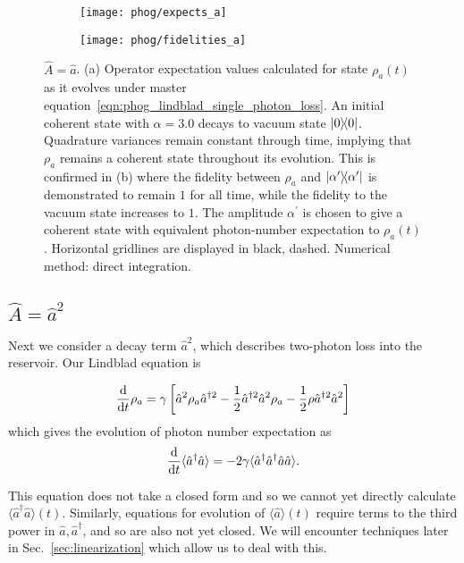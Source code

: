 \begin{figure}[htp]
\captionsetup{width=0.8\linewidth}
\centering
	\begin{subfigure}{0.7\linewidth}
	\centering
	\caption{}
	\texttt{[image: phog/expects\_a]}
	\end{subfigure}
	\begin{subfigure}{0.7\linewidth}
	\centering
	\caption{}
	\texttt{[image: phog/fidelities\_a]}
	\end{subfigure}
\caption{\label{fig:phog_lindblad_single_photon_loss}$\hat{A} = \hat{a}$. (a) Operator expectation values calculated for state $\rho_a\left(t\right)$ as it evolves under master equation~\ref{eqn:phog_lindblad_single_photon_loss}. An initial coherent state with $\alpha=3.0$ decays to vacuum state $\dyad{0}$. Quadrature variances remain constant through time, implying that $\rho_a$ remains a coherent state throughout its evolution. This is confirmed in (b) where the fidelity between $\rho_a$ and $\dyad{\alpha^\prime}$ is demonstrated to remain $1$ for all time, while the fidelity to the vacuum state increases to $1$. The amplitude $\alpha^\prime$ is chosen to give a coherent state with equivalent photon-number expectation to $\rho_a\left(t\right)$. Horizontal gridlines are displayed in black, dashed. Numerical method: direct integration.}
\end{figure}


\FloatBarrier
\subsection{$\hat{A} = \hat{a}^2$}\label{sec:A_aa}
Next we consider a decay term $\hat{a}^2$, which describes two-photon loss into the reservoir. Our Lindblad equation is

\begin{equation}\label{eqn:phog_lindblad_two_photon_loss}
\frac{\mathrm{d}}{\mathrm{d}t} \rho_a = \gamma\left[\hat{a}^2 \rho_a \hat{a}^{\dagger 2} - \frac{1}{2} \hat{a}^{\dagger 2} \hat{a}^2 \rho_a - \frac{1}{2} \rho \hat{a}^{\dagger 2} \hat{a}^2\right]
\end{equation}
which gives the evolution of photon number expectation as 
\begin{equation}\label{eqn:aa_not_closed}
\frac{\mathrm{d}}{\mathrm{d}t} \langle \hat{a}^\dagger \hat{a}\rangle = - 2 \gamma \langle \hat{a}^\dagger \hat{a}^\dagger \hat{a}\hat{a}\rangle.
\end{equation}

\noindent This equation does not take a closed form and so we cannot yet directly calculate $\langle \hat{a}^\dagger \hat{a}\rangle\left(t\right)$. Similarly, equations for evolution of $\langle\hat{a}\rangle\left(t\right)$ require terms to the third power in $\hat{a}, \hat{a}^\dagger$, and so are also not yet closed.  We will encounter techniques later in Sec.~\ref{sec:linearization} which allow us to deal with this.

